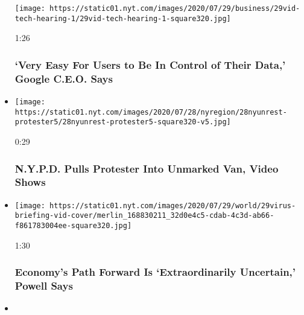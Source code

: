 \begin{itemize}
  \texttt{[image: https://static01.nyt.com/images/2020/07/29/business/29vid-tech-hearing-1/29vid-tech-hearing-1-square320.jpg]}

  1:26

  \hypertarget{very-easy-for-users-to-be-in-control-of-their-data-google-ceo-says}{%
  \subsubsection{`Very Easy For Users to Be In Control of Their Data,'
  Google C.E.O.
  Says}\label{very-easy-for-users-to-be-in-control-of-their-data-google-ceo-says}}
\item
  \href{https://www.nytimes.com/video/us/100000007262950/nypd-unmarked-van.html?action=click\&module=video-series-bar\&region=header\&pgtype=Article\&playlistId=video/latest-video}{}

  \texttt{[image: https://static01.nyt.com/images/2020/07/28/nyregion/28nyunrest-protester5/28nyunrest-protester5-square320-v5.jpg]}

  0:29

  \hypertarget{nypd-pulls-protester-into-unmarked-van-video-shows}{%
  \subsubsection{N.Y.P.D. Pulls Protester Into Unmarked Van, Video
  Shows}\label{nypd-pulls-protester-into-unmarked-van-video-shows}}
\item
  \href{https://www.nytimes.com/video/us/100000007262574/fed-powell-economy-coronavirus.html?action=click\&module=video-series-bar\&region=header\&pgtype=Article\&playlistId=video/latest-video}{}

  \texttt{[image: https://static01.nyt.com/images/2020/07/29/world/29virus-briefing-vid-cover/merlin\_168830211\_32d0e4c5-cdab-4c3d-ab66-f861783004ee-square320.jpg]}

  1:30

  \hypertarget{economys-path-forward-is-extraordinarily-uncertain-powell-says}{%
  \subsubsection{Economy's Path Forward Is `Extraordinarily Uncertain,'
  Powell
  Says}\label{economys-path-forward-is-extraordinarily-uncertain-powell-says}}
\item
  \href{https://www.nytimes.com/video/us/100000007262407/umbrella-man-minneapolis-video.html?action=click\&module=video-series-bar\&region=header\&pgtype=Article\&playlistId=video/latest-video}{}


\end{itemize}
